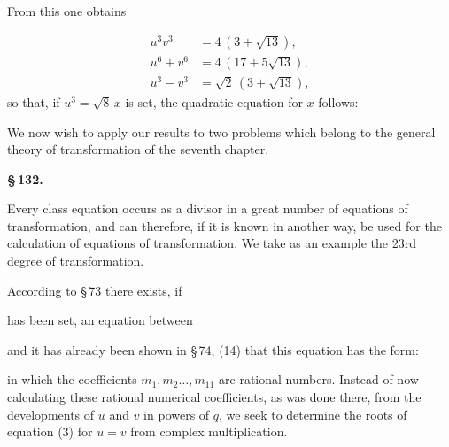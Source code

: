 
From this one obtains

\[
\begin{aligned}
u^3v^3 &= 4\,(3+\sqrt{13}), \\
u^6+v^6 &= 4\,(17+5\sqrt{13}), \\
u^3-v^3 &= \sqrt{2}\,(3+\sqrt{13}),
\end{aligned}
\]
so that, if $u^3 = \sqrt{8}\,x$ is set, the quadratic equation for $x$ follows:


We now wish to apply our results to two problems which belong to the general theory of transformation of the seventh chapter.

\begin{center}
\textbf{\S\,132. }
\end{center}

Every class equation occurs as a divisor in a great number of equations of transformation, and can therefore, if it is known in another way, be used for the calculation of equations of transformation. We take as an example the 23rd degree of transformation.

According to \S\,73 there exists, if


has been set, an equation between


and it has already been shown in \S\,74, (14) that this equation has the form:


in which the coefficients $m_1, m_2 \ldots, m_{11}$ are rational numbers. Instead of now calculating these rational numerical coefficients, as was done there, from the developments of $u$ and $v$ in powers of $q$, we seek to determine the roots of equation (3) for $u=v$ from complex multiplication.
